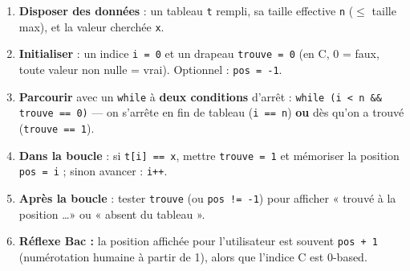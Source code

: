 \documentclass[11pt]{article}
\begin{document}
\begin{methode}
\begin{enumerate}
\item \textbf{Disposer des données} : un tableau \texttt{t} rempli, sa taille effective \texttt{n} ($\le$ taille max), et la valeur cherchée \texttt{x}.
\item \textbf{Initialiser} : un indice \texttt{i = 0} et un drapeau \texttt{trouve = 0} (en C, 0 = faux, toute valeur non nulle = vrai). Optionnel : \texttt{pos = -1}.
\item \textbf{Parcourir} avec un \texttt{while} à \textbf{deux conditions} d'arrêt : \texttt{while (i < n \&\& trouve == 0)} — on s'arrête en fin de tableau (\texttt{i == n}) \textbf{ou} dès qu'on a trouvé (\texttt{trouve == 1}).
\item \textbf{Dans la boucle} : si \texttt{t[i] == x}, mettre \texttt{trouve = 1} et mémoriser la position \texttt{pos = i} ; sinon avancer : \texttt{i++}.
\item \textbf{Après la boucle} : tester \texttt{trouve} (ou \texttt{pos != -1}) pour afficher « trouvé à la position \ldots » ou « absent du tableau ».
\item \textbf{Réflexe Bac :} la position affichée pour l'utilisateur est souvent \texttt{pos + 1} (numérotation humaine à partir de 1), alors que l'indice C est 0-based.
\end{enumerate}
\end{methode}
\end{document}

